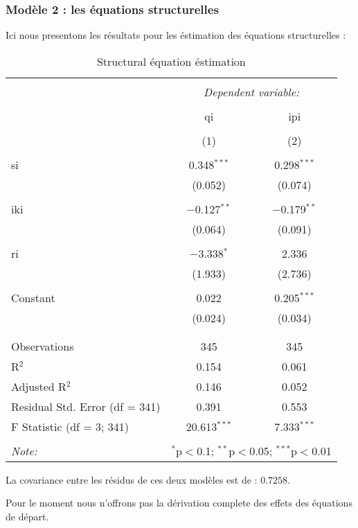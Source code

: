 \documentclass[11pt, a4paper]{article}
\begin{document}
\subsubsection{Modèle 2 : les équations structurelles}
Ici nous presentons les résultats pour les éstimation des équations structurelles :
\FloatBarrier
\begin{table}[!htbp]
  \centering
  \begin{tabular}{@{\extracolsep{5pt}}lcc} 
    \\[-1.8ex]\hline 
    \hline \\[-1.8ex] 
     & \multicolumn{2}{c}{\textit{Dependent variable:}} \\ 
    \cline{2-3} 
    \\[-1.8ex] & qi & ipi \\ 
    \\[-1.8ex] & (1) & (2)\\ 
    \hline \\[-1.8ex]
     si & 0.348$^{***}$ & 0.298$^{***}$ \\ 
      & (0.052) & (0.074) \\ 
      & & \\ 
     iki & $-$0.127$^{**}$ & $-$0.179$^{**}$ \\ 
      & (0.064) & (0.091) \\ 
      & & \\ 
     ri & $-$3.338$^{*}$ & 2.336 \\ 
      & (1.933) & (2.736) \\ 
      & & \\ 
     Constant & 0.022 & 0.205$^{***}$ \\ 
      & (0.024) & (0.034) \\ 
      & & \\ 
    \hline \\[-1.8ex] 
    Observations & 345 & 345 \\ 
    R$^{2}$ & 0.154 & 0.061 \\ 
    Adjusted R$^{2}$ & 0.146 & 0.052 \\ 
    Residual Std. Error (df = 341) & 0.391 & 0.553 \\ 
    F Statistic (df = 3; 341) & 20.613$^{***}$ & 7.333$^{***}$ \\ 
    \hline 
    \hline \\[-1.8ex] 
    \textit{Note:}  & \multicolumn{2}{r}{$^{*}$p$<$0.1; $^{**}$p$<$0.05; $^{***}$p$<$0.01} \\ 
    \end{tabular} 
  \caption{Structural équation éstimation}
\end{table}
\FloatBarrier
La covariance entre les résidus de ces deux modèles est de : $0.7258$.
\par 
Pour le moment nous n'offrons pas la dérivation complete des effets des équations de départ.
\end{document}
